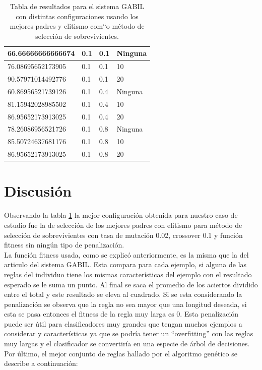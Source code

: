 \documentclass[a4paper,10pt]{article}
\begin{document}
\begin{table}[!hbtp]
\begin{tabular}{|l|p{2.4cm}|p{2.4cm}|p{2.4cm}|}
\hline
66.66666666666674 & 0.1 & 0.1 & Ninguna \\
\hline
76.08695652173905 & 0.1 & 0.1 & 10 \\
\hline
90.57971014492776 & 0.1 & 0.1 & 20 \\
\hline
60.86956521739126 & 0.1 & 0.4 & Ninguna \\
\hline
81.15942028985502 & 0.1 & 0.4 & 10 \\
\hline
86.95652173913025 & 0.1 & 0.4 & 20 \\
\hline
78.26086956521726 & 0.1 & 0.8 & Ninguna \\
\hline
85.50724637681176 & 0.1 & 0.8 & 10 \\
\hline
86.95652173913025 & 0.1 & 0.8 & 20 \\
\hline
\end{tabular}
\caption{Tabla de resultados para el sistema GABIL con distintas configuraciones usando los mejores 
padres y elitismo com``o método de selección de sobrevivientes. \label{tabla}}
\end{table}

\section{Discusión}

\indent Observando la tabla \ref{tabla} la mejor configuración obtenida para nuestro caso de estudio 
fue la de selección de los mejores padres con elitismo para método de selección de sobrevivientes con 
tasa de mutación 0.02, crossover 0.1 y función fitness sin ningún tipo de penalización.\\
\indent La función fitness usada, como se explicó anteriormente, es la misma que la del articulo 
del sistema GABIL. Esta compara  para cada ejemplo, si alguna de las reglas del individuo tiene los mismas características 
del ejemplo con el resultado esperado se le suma un punto. Al final se saca el promedio de los aciertos dividido entre
el total y este resultado se eleva al cuadrado. Si se esta considerando la penalización se observa que la regla 
no sea mayor que una longitud deseada, si esta se pasa entonces el fitness de la regla muy larga es 0. 
Esta penalización puede ser útil para clasificadores muy grandes que tengan muchos ejemplos a considerar y 
características ya que se podría tener un ``overfitting'' con las reglas muy largas y el clasificador
se convertiría en una especie de árbol de decisiones.\\ 
\indent Por último, el mejor conjunto de reglas hallado por el algoritmo genético se describe a continuación:
\end{document}
